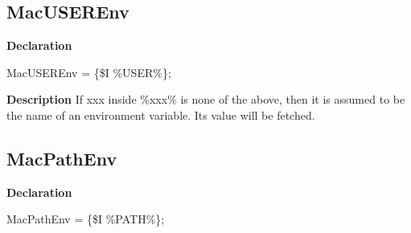 \documentclass{report}
\begin{document}
\subsection*{MacUSEREnv}
\begin{list}{}{
\setlength{\itemindent}{0cm}
\setlength{\listparindent}{0cm}
\setlength{\leftmargin}{\evensidemargin}
\addtolength{\leftmargin}{\tmplength}
\settowidth{\labelsep}{X}
\addtolength{\leftmargin}{\labelsep}
\setlength{\labelwidth}{\tmplength}
}
\begin{flushleft}
\item[\textbf{Declaration}\hfill]
\begin{ttfamily}
MacUSEREnv = {\{}{\$}I {\%}USER{\%}{\}};\end{ttfamily}


\end{flushleft}
\par
\item[\textbf{Description}]
If xxx inside {\%}xxx{\%} is none of the above, then it is assumed to be the name of an environment variable. Its value will be fetched.

\end{list}
\subsection*{MacPathEnv}
\begin{list}{}{
\setlength{\itemindent}{0cm}
\setlength{\listparindent}{0cm}
\setlength{\leftmargin}{\evensidemargin}
\addtolength{\leftmargin}{\tmplength}
\settowidth{\labelsep}{X}
\addtolength{\leftmargin}{\labelsep}
\setlength{\labelwidth}{\tmplength}
}
\begin{flushleft}
\item[\textbf{Declaration}\hfill]
\begin{ttfamily}
MacPathEnv = {\{}{\$}I {\%}PATH{\%}{\}};\end{ttfamily}


\end{flushleft}
\end{list}
\end{document}
